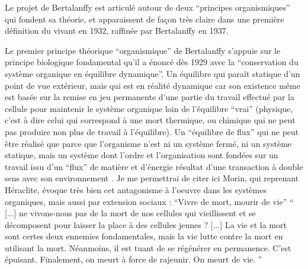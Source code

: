 
Le projet de Bertalanffy est articulé autour de deux \enquote{principes organismiques} qui fondent sa théorie, et apparaissent de façon très claire dans une première définition du vivant en 1932, raffinée par Bertalanffy en 1937.


Le premier principe théorique \enquote{organismique} de Bertalanffy s'appuie sur le principe biologique fondamental qu'il a énoncé dès 1929 avec la \enquote{conservation du système organique en équilibre dynamique}. Un équilibre qui paraît statique d'un point de vue extérieur, mais qui est en réalité dynamique car son existence même est basée sur la remise en jeu permanente d'une partie du travail effectué par la cellule pour maintenir le système organique loin de l'équilibre \enquote{vrai} (physique, c'est à dire celui qui correspond à une mort thermique, ou chimique qui ne peut pas produire non plus de travail à l'équilibre). Un \enquote{équilibre de flux} qui ne peut être réalisé que parce que l'organisme n'est ni un système fermé, ni un système statique, mais un système dont l'ordre et l'organisation sont fondées sur un travail issu d'un \enquote{flux} de matière et d'énergie résultat d'une transaction à double sens avec son environnement \autocite[472]{Pouvreau2013}. Je me permettrai de citer ici Morin, qui reprenant Héraclite, évoque très bien cet antagonisme à l'oeuvre dans les systèmes organiques, mais aussi par extension sociaux : \enquote{Vivre de mort, mourir de vie} \enquote{ [...] ne vivons-nous pas de la mort de nos cellules qui vieillissent et se décomposent pour laisser la place à des cellules jeunes ? [...] La vie et la mort sont certes deux ennemies fondamentales, mais la vie lutte contre la mort en utilisant la mort. Néanmoins, il est tuant de se régénérer en permanence. C’est épuisant. Finalement, on meurt à force de rajeunir. On meurt de vie. } 

